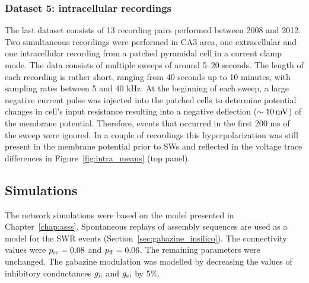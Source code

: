     \subsubsection{Dataset 5: intracellular recordings}
      The last dataset consists of 13 recording pairs performed between 2008
      and 2012. Two simultaneous recordings were performed in CA3 area, one
      extracellular and one intracellular recording from a patched pyramidal
      cell in a current clamp mode. The data consists of multiple sweeps of
      around 5--20 seconds. The length of each recording is rather short,
      ranging from 40 seconds up to 10 minutes, with sampling rates between 5
      and 40 kHz. At the beginning of each sweep, a large negative current
      pulse was injected into the patched cells to determine potential changes
      in cell's input resistance resulting into a negative deflection ($\sim
      10\, \rm mV$) of the membrane potential. Therefore, events that occurred
      in the first 200 ms of the sweep were ignored. In a couple of recordings
      this hyperpolarization was still present in the membrane potential prior
      to SWs and reflected in the voltage trace differences in
      Figure~\ref{fig:intra_means} (top panel).

  \subsection{Simulations}
    The network simulations were based on the model presented in
    Chapter~\ref{chap:asss}. Spontaneous replays of assembly sequences
    are used as a model for the SWR events
    (Section~\ref{sec:gabazine_insilico}). The connectivity values were $p_{\rm
    rc}=0.08$ and $p_{\rm ff}=0.06$. The remaining parameters were unchanged.
    The gabazine modulation was modelled by decreasing the values of inhibitory
    conductances $g_{\rm ii}$ and  $g_{\rm ei}$ by 5\%.
    
